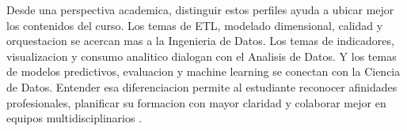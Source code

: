\documentclass[12pt]{article}
\begin{document}
Desde una perspectiva academica, distinguir estos perfiles ayuda a ubicar mejor los contenidos del curso. Los temas de ETL, modelado dimensional, calidad y orquestacion se acercan mas a la Ingenieria de Datos. Los temas de indicadores, visualizacion y consumo analitico dialogan con el Analisis de Datos. Y los temas de modelos predictivos, evaluacion y machine learning se conectan con la Ciencia de Datos. Entender esa diferenciacion permite al estudiante reconocer afinidades profesionales, planificar su formacion con mayor claridad y colaborar mejor en equipos multidisciplinarios \cite{kimball_dw_toolkit,provost_fawcett}.

\newpage
\printbibliography
\end{document}
